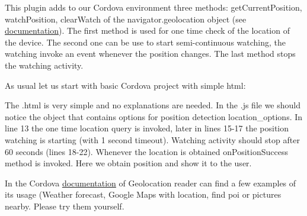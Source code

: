 This plugin adds to our Cordova environment three methods: getCurrentPosition, watchPosition, clearWatch of the navigator.geolocation object (see \href{https://cordova.apache.org/docs/en/8.x/reference/cordova-plugin-geolocation/}{documentation}). The first method is used for one time check of the location of the device. The second one can be use to start semi-continuous watching, the watching invoke an event whenever the position changes. The last method stops the watching activity.

As usual let us start with basic Cordova project with simple html:



\begin{explain}
The .html is very simple and no explanations are needed. In the .js file we should notice the object that contains options for position detection location\_options. In line 13 the one time location query is invoked, later in lines 15-17 the position watching is starting (with 1 second timeout). Watching activity should stop after 60 seconds (lines 18-22). Whenever the location is obtained onPositionSuccess method is invoked. Here we obtain position and show it to the user.
\end{explain}

\begin{extercises}
  In the Cordova \href{https://cordova.apache.org/docs/en/latest/reference/cordova-plugin-geolocation/index.html}{documentation} of Geolocation  reader can find a few examples of its usage (Weather forecast, Google Maps with location, find poi or pictures nearby. Please try them yourself.
\end{extercises}






